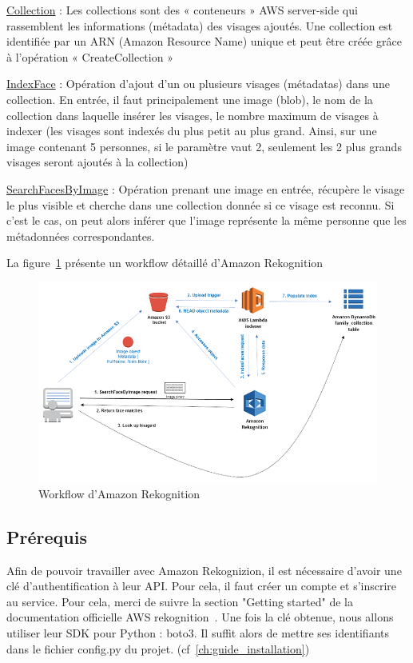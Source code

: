 \underline{Collection} : Les collections sont des « conteneurs » AWS server-side qui rassemblent les informations (métadata)
des visages ajoutés. Une collection est identifiée par un ARN (Amazon Resource Name) unique et peut être créée
grâce à l’opération « CreateCollection »

\underline{IndexFace} : Opération d’ajout d’un ou plusieurs visages (métadatas) dans une collection. En entrée, il faut
principalement une image (blob), le nom de la collection dans laquelle insérer les visages, le nombre maximum de
visages à indexer (les visages sont indexés du plus petit au plus grand. Ainsi, sur une image contenant 5 personnes,
si le paramètre vaut 2, seulement les 2 plus grands visages seront ajoutés à la collection)

\underline{SearchFacesByImage}\label{text:SearchFacesByImage} : Opération prenant une image en entrée, récupère le visage le plus visible et cherche dans
une collection donnée si ce visage est reconnu. Si c’est le cas, on peut alors inférer que l’image représente la même
personne que les métadonnées correspondantes.

La figure~\ref{fig:reko-workflow} présente un workflow détaillé d’Amazon Rekognition

\begin{figure}[H]
	\centering
	\includegraphics[width=12cm]{images/proto-6.png}
	\caption{Workflow d'Amazon Rekognition}
	\label{fig:reko-workflow}
\end{figure}

\subsection{Prérequis}

Afin de pouvoir travailler avec Amazon Rekognizion, il est nécessaire d’avoir une clé d’authentification à leur API.
Pour cela, il faut créer un compte et s’inscrire au service. Pour cela, merci de suivre la section "Getting started" de la documentation
officielle AWS rekognition~\cite{AWSDOCS}. Une fois la clé obtenue, nous allons utiliser leur SDK pour
Python : boto3. Il suffit alors de mettre ses identifiants dans le fichier config.py du projet. (cf~\ref{ch:guide_installation}) 